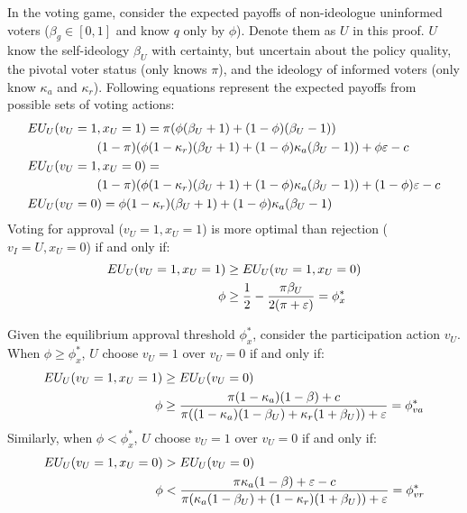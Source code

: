 \par In the voting game, consider the expected payoffs of non-ideologue uninformed voters ($\beta_g \in [0,1]$ and know $q$ only by $\phi$). Denote them as $U$ in this proof. $U$ know the self-ideology $\beta_U$ with certainty, but uncertain about the policy quality, the pivotal voter status (only knows $\pi$), and the ideology of informed voters (only know $\kappa_a$ and $\kappa_r$). Following equations represent the expected payoffs from possible sets of voting actions:
\begin{align*}
EU_U(v_U=1&, x_U=1) = 
\pi (\phi (\beta_U + 1) + (1-\phi) (\beta_U - 1)) \\
&(1-\pi) (\phi (1-\kappa_{r}) (\beta_U + 1) + (1-\phi ) \kappa_{a} (\beta_U - 1)) + \phi \varepsilon - c \\
EU_U(v_U=1& ,x_U=0) = \notag \\
&(1-\pi) (\phi (1-\kappa_{r}) (\beta_U+1) + (1-\phi) \kappa_{a} (\beta_U - 1))+ (1-\phi) \varepsilon - c \\
EU_U(v_U=0&) = \phi (1-\kappa_{r}) (\beta_U+1) + (1-\phi) \kappa_{a} (\beta_U - 1)
\end{align*}
\noindent Voting for approval ($v_U=1,x_U=1$) is more optimal than rejection ($v_I=U,x_U=0$) if and only if:
\begin{align*}
EU_U(v_U=1, x_U=1) &\geq EU_U(v_U=1, x_U=0) \notag \\
\phi &\geq \frac{1}{2} - \frac{\pi \beta_U}{2(\pi + \varepsilon)} = \phi^*_x
\end{align*}

\par Given the equilibrium approval threshold $\phi^*_x$, consider the participation action $v_U$. When $\phi \geq \phi^*_x$, $U$ choose $v_U=1$ over $v_U=0$ if and only if:
\begin{align*}
EU_U(v_U=1, x_U=1) &\geq EU_U(v_U=0) \notag \\
\phi &\geq \frac{\pi (1- \kappa_{a}) (1-\beta) + c}{\pi ((1 - \kappa_{a}) (1-\beta_U) + \kappa_{r} (1+\beta_U)) + \varepsilon} = \phi^*_{va} 
\end{align*}
\noindent Similarly, when $\phi < \phi^*_x$, $U$ choose $v_U=1$ over $v_U=0$ if and only if: 
\begin{align*}
EU_U(v_U=1, x_U=0) &> EU_U(v_U=0) \notag \\
\phi &< \frac{\pi \kappa_{a} (1-\beta) + \varepsilon - c}{\pi ( \kappa_{a} (1-\beta_U) + (1-\kappa_{r}) (1+\beta_U) ) + \varepsilon} = \phi^*_{vr} 
\end{align*}

